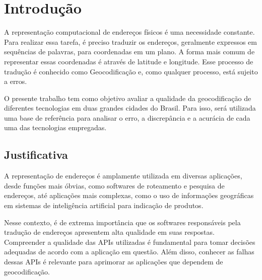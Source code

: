 \chapter{Introdução} \label{Introducao}









A representação computacional de endereços físicos é uma necessidade constante. Para realizar essa tarefa, é preciso traduzir os endereços, geralmente expressos em sequências de palavras, para coordenadas em um plano. A forma mais comum de representar essas coordenadas é através de latitude e longitude. Esse processo de tradução é conhecido como Geocodificação e, como qualquer processo, está sujeito a erros.

O presente trabalho tem como objetivo avaliar a qualidade da geocodificação de diferentes tecnologias em duas grandes cidades do Brasil. Para isso, será utilizada uma base de referência para analisar o erro, a discrepância e a acurácia de cada uma das tecnologias empregadas.

\section{Justificativa}

A representação de endereços é amplamente utilizada em diversas aplicações, desde funções mais óbvias, como softwares de roteamento e pesquisa de endereços, até aplicações mais complexas, como o uso de informações geográficas em sistemas de inteligência artificial para indicação de produtos.

Nesse contexto, é de extrema importância que os softwares responsáveis pela tradução de endereços apresentem alta qualidade em suas respostas. Compreender a qualidade das APIs utilizadas é fundamental para tomar decisões adequadas de acordo com a aplicação em questão. Além disso, conhecer as falhas dessas APIs é relevante para aprimorar as aplicações que dependem de geocodificação.

